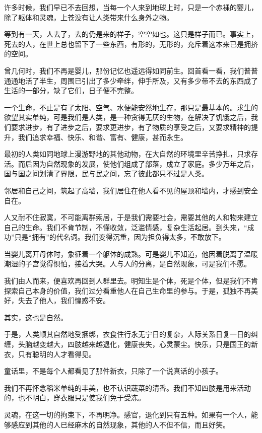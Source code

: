 \par 许多时候，我们早已不去回想，当每一个人来到地球上时，只是一个赤裸的婴儿，除了躯体和灵魂，上苍没有让人类带来什么身外之物。
\par 等到有一天，人去了，去的仍是来的样子，空空如也。这只是样子而已。事实上，死去的人，在世上总也留下了一些东西，有形的，无形的，充斥着这本来已是拥挤的空间。
\par 曾几何时，我们不再是婴儿，那份记忆也遥远得如同前生。回首看一看，我们普普通通地活了半生，周围已引出了多少牵绊，伸手所及，又有多少带不去的东西成了生活的一部分，缺了它们，日子便不完整。
\par 一个生命，不止是有了太阳、空气、水便能安然地生存，那只是最基本的。求生的欲望其实单纯，可是我们是人类，是一种贪得无厌的生物，在解决了饥饿之后，我们要求进步，有了进步之后，要求更进步，有了物质的享受之后，又要求精神的提升，我们追求幸福、快乐、和谐、富有、健康，甚而永生。
\par 最初的人类如同地球上漫游野地的其他动物，在大自然的环境里辛苦挣扎，只求存活。而后因为自然现象的发展，使他们组成了部落，成立了家庭。多少万年之后，国与国之间划清了界限，民与民之间，忘了彼此都只不过是人类。
\par 邻居和自己之间，筑起了高墙，我们居住在他人看不见的屋顶和墙内，才感到安全自在。
\par 人又耐不住寂寞，不可能离群索居，于是我们需要社会，需要其他的人和物来建立自己的生命。我们不肯节制，不懂收敛，泛滥情感，复杂生活起居。到头来，“成功”只是“拥有”的代名词。我们变得沉重，因为担负得太多，不敢放下。
\par 当婴儿离开母体时，象征着一个躯体的成熟。可是婴儿不知道，他因着脱离了温暖潮湿的子宫觉得惧怕，接着大哭。人与人的分离，是自然现象，可是我们不愿。
\par 我们由人而来，便喜欢再回到人群里去。明知生是个体，死是个体，但是我们不肯探索自己本身的价值，我们过分看重他人在自己生命里的参与。于是，孤独不再美好，失去了他人，我们惶惑不安。
\par 其实，这也是自然。
\par 于是，人类顺其自然地受捆绑，衣食住行永无宁日的复杂，人际关系日复一日的纠缠，头脑越变越大，四肢越来越退化，健康丧失，心灵蒙尘。快乐，只是国王的新衣，只有聪明的人才看得见。
\par 童话里，不是每个人都看见了那件新衣，只除了一个说真话的小孩子。
\par 我们不再怀念稻米单纯的丰美，也不认识蔬菜的清香。我们不知四肢是用来活动的，也不明白，穿衣服只是使我们免于受冻。
\par 灵魂，在这一切的拘束下，不再明净。感官，退化到只有五种。如果有一个人，能够感应到其他的人已经麻木的自然现象，其他的人不但不信，而且好笑。
